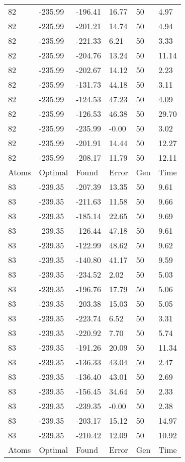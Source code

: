 \documentclass{report}
\begin{document}
\begin{appendix}
\begin{longtable}{llllll}
82 & -235.99 & -196.41 & 16.77 & 50 & 4.97 \\
82 & -235.99 & -201.21 & 14.74 & 50 & 4.94 \\
82 & -235.99 & -221.33 & 6.21 & 50 & 3.33 \\
82 & -235.99 & -204.76 & 13.24 & 50 & 11.14 \\
82 & -235.99 & -202.67 & 14.12 & 50 & 2.23 \\
82 & -235.99 & -131.73 & 44.18 & 50 & 3.11 \\
82 & -235.99 & -124.53 & 47.23 & 50 & 4.09 \\
82 & -235.99 & -126.53 & 46.38 & 50 & 29.70 \\
82 & -235.99 & -235.99 & -0.00 & 50 & 3.02 \\
82 & -235.99 & -201.91 & 14.44 & 50 & 12.27 \\
82 & -235.99 & -208.17 & 11.79 & 50 & 12.11 \\
Atoms & Optimal & Found & Error & Gen & Time \\
83 & -239.35 & -207.39 & 13.35 & 50 & 9.61 \\
83 & -239.35 & -211.63 & 11.58 & 50 & 9.66 \\
83 & -239.35 & -185.14 & 22.65 & 50 & 9.69 \\
83 & -239.35 & -126.44 & 47.18 & 50 & 9.61 \\
83 & -239.35 & -122.99 & 48.62 & 50 & 9.62 \\
83 & -239.35 & -140.80 & 41.17 & 50 & 9.59 \\
83 & -239.35 & -234.52 & 2.02 & 50 & 5.03 \\
83 & -239.35 & -196.76 & 17.79 & 50 & 5.06 \\
83 & -239.35 & -203.38 & 15.03 & 50 & 5.05 \\
83 & -239.35 & -223.74 & 6.52 & 50 & 3.31 \\
83 & -239.35 & -220.92 & 7.70 & 50 & 5.74 \\
83 & -239.35 & -191.26 & 20.09 & 50 & 11.34 \\
83 & -239.35 & -136.33 & 43.04 & 50 & 2.47 \\
83 & -239.35 & -136.40 & 43.01 & 50 & 2.69 \\
83 & -239.35 & -156.45 & 34.64 & 50 & 2.33 \\
83 & -239.35 & -239.35 & -0.00 & 50 & 2.38 \\
83 & -239.35 & -203.17 & 15.12 & 50 & 14.97 \\
83 & -239.35 & -210.42 & 12.09 & 50 & 10.92 \\
Atoms & Optimal & Found & Error & Gen & Time \\

\end{longtable}
\end{appendix}
\end{document}
